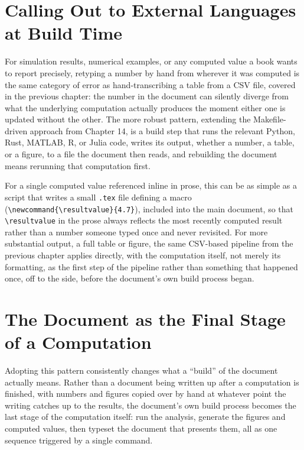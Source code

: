 \hypertarget{calling-out-to-external-languages-at-build-time}{%
\section{Calling Out to External Languages at Build Time}\label{calling-out-to-external-languages-at-build-time}}

For simulation results, numerical examples, or any computed value a book wants to report precisely, retyping a number by hand from wherever it was computed is the same category of error as hand-transcribing a table from a CSV file, covered in the previous chapter: the number in the document can silently diverge from what the underlying computation actually produces the moment either one is updated without the other. The more robust pattern, extending the Makefile-driven approach from Chapter 14, is a build step that runs the relevant Python, Rust, MATLAB, R, or Julia code, writes its output, whether a number, a table, or a figure, to a file the document then reads, and rebuilding the document means rerunning that computation first.

For a single computed value referenced inline in prose, this can be as simple as a script that writes a small \texttt{.tex} file defining a macro (\texttt{\textbackslash{}newcommand\{\textbackslash{}resultvalue\}\{4.7\}}), included into the main document, so that \texttt{\textbackslash{}resultvalue} in the prose always reflects the most recently computed result rather than a number someone typed once and never revisited. For more substantial output, a full table or figure, the same CSV-based pipeline from the previous chapter applies directly, with the computation itself, not merely its formatting, as the first step of the pipeline rather than something that happened once, off to the side, before the document's own build process began.

\hypertarget{the-document-as-the-final-stage-of-a-computation}{%
\section{The Document as the Final Stage of a Computation}\label{the-document-as-the-final-stage-of-a-computation}}

Adopting this pattern consistently changes what a ``build'' of the document actually means. Rather than a document being written up after a computation is finished, with numbers and figures copied over by hand at whatever point the writing catches up to the results, the document's own build process becomes the last stage of the computation itself: run the analysis, generate the figures and computed values, then typeset the document that presents them, all as one sequence triggered by a single command.

